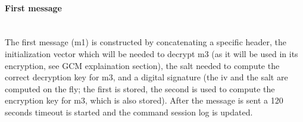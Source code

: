 \paragraph{First message}\hspace{0pt}\\
The first message (m1) is constructed by concatenating a specific header, the initialization vector which will be needed to decrypt m3 (as it will be used in its encryption, see GCM explaination section), the salt needed to compute the correct decryption key for m3, and a digital signature (the iv and the salt are computed on the fly; the first is stored, the second is used to compute the encryption key for m3, which is also stored). After the message is sent a 120 seconds timeout is started and the command session log is updated.